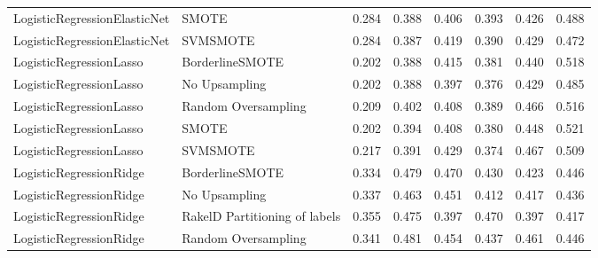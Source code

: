 \begin{tabular}{llllllll}
   LogisticRegressionElasticNet &                         SMOTE & 0.284 &                     0.388 &                 0.406 &                  0.393 &                                   0.426 &     0.488 \\
   LogisticRegressionElasticNet &                      SVMSMOTE & 0.284 &                     0.387 &                 0.419 &                  0.390 &                                   0.429 &     0.472 \\
        LogisticRegressionLasso &               BorderlineSMOTE & 0.202 &                     0.388 &                 0.415 &                  0.381 &                                   0.440 &     0.518 \\
        LogisticRegressionLasso &                 No Upsampling & 0.202 &                     0.388 &                 0.397 &                  0.376 &                                   0.429 &     0.485 \\
        LogisticRegressionLasso &           Random Oversampling & 0.209 &                     0.402 &                 0.408 &                  0.389 &                                   0.466 &     0.516 \\
        LogisticRegressionLasso &                         SMOTE & 0.202 &                     0.394 &                 0.408 &                  0.380 &                                   0.448 &     0.521 \\
        LogisticRegressionLasso &                      SVMSMOTE & 0.217 &                     0.391 &                 0.429 &                  0.374 &                                   0.467 &     0.509 \\
        LogisticRegressionRidge &               BorderlineSMOTE & 0.334 &                     0.479 &                 0.470 &                  0.430 &                                   0.423 &     0.446 \\
        LogisticRegressionRidge &                 No Upsampling & 0.337 &                     0.463 &                 0.451 &                  0.412 &                                   0.417 &     0.436 \\
        LogisticRegressionRidge & RakelD Partitioning of labels & 0.355 &                     0.475 &                 0.397 &                  0.470 &                                   0.397 &     0.417 \\
        LogisticRegressionRidge &           Random Oversampling & 0.341 &                     0.481 &                 0.454 &                  0.437 &                                   0.461 &     0.446 \\

\end{tabular}

